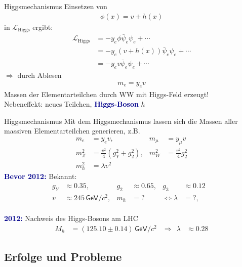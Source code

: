 \documentclass[hyperref={pdfpagelabels=false},ngerman]{beamer}
\newcommand{\eh}[1]{\,\mathsf{#1}}
\newcommand{\Lagr}{\mathcal{L}}
\renewcommand{\emph}[1]{\textbf{\textcolor{darkblue}{#1}}}
\newcommand{\GeV}{\eh{GeV}}
\begin{document}
\begin{frame}{Higgsmechanismus}
  Einsetzen von
  \begin{align*}
    \phi(x) = v + h(x)
  \end{align*}
  in $\Lagr_{\text{Higgs}}$ ergibt:
  \begin{align*}
    \Lagr_{\text{Higgs}}
    &= - y_e \phi \bar{\psi}_e \psi_e + \cdots \\
    &= - y_e (v + h(x)) \bar{\psi}_e \psi_e + \cdots \\
    &= - y_e v \bar{\psi}_e \psi_e + \cdots
  \end{align*}
  $\Rightarrow$ durch Ablesen
  \begin{align*}
    m_e = y_e v
  \end{align*}
  Massen der Elementarteilchen durch WW mit Higgs-Feld erzeugt!\\
  Nebeneffekt: neues Teilchen, \emph{Higgs-Boson} $h$
\end{frame}

\begin{frame}{Higgsmechanismus}
  Mit dem Higgsmechanismus lassen sich die Massen aller massiven
  Elementarteilchen generieren, z.B.
  \begin{align*}
    m_e &= y_e v, & m_\mu &= y_\mu v \\
    m_Z^2 &= \frac{v^2}{4}(g_Y^2 + g_2^2) , &  m_W^2 &= \frac{v^2}{4} g_2^2 \\
    m_h^2 &= \lambda v^2
  \end{align*}
  \emph{Bevor 2012:}
  Bekannt:
  \begin{align*}
    g_Y &\approx 0.35, &
    g_2 &\approx 0.65, &
    g_3 &\approx 0.12 \\
    v &\approx 245\GeV/c^2, &
    m_h &={} ? &
    \Leftrightarrow \lambda &={} ?, &
  \end{align*}
  \\[1em]
  \emph{2012:} Nachweis des Higgs-Bosons am LHC
  \begin{align*}
    M_h &= (125.10\pm 0.14) \GeV/c^2 &
    \Rightarrow \ \ \lambda &\approx 0.28
  \end{align*}
\end{frame}

\subsection{Erfolge und Probleme}
\end{document}
